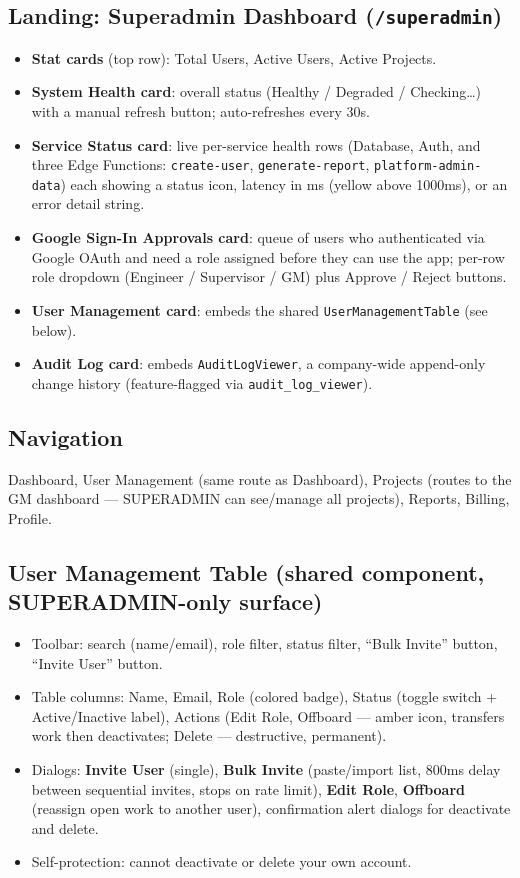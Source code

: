 \documentclass[11pt]{article}
\begin{document}
\subsection{Landing: Superadmin Dashboard (\texttt{/superadmin})}
\begin{itemize}[nosep]
  \item \textbf{Stat cards} (top row): Total Users, Active Users, Active Projects.
  \item \textbf{System Health card}: overall status (Healthy / Degraded / Checking\ldots) with a
    manual refresh button; auto-refreshes every 30s.
  \item \textbf{Service Status card}: live per-service health rows (Database, Auth, and three Edge
    Functions: \texttt{create-user}, \texttt{generate-report}, \texttt{platform-admin-data}) each
    showing a status icon, latency in ms (yellow above 1000ms), or an error detail string.
  \item \textbf{Google Sign-In Approvals card}: queue of users who authenticated via Google OAuth
    and need a role assigned before they can use the app; per-row role dropdown (Engineer /
    Supervisor / GM) plus Approve / Reject buttons.
  \item \textbf{User Management card}: embeds the shared \texttt{UserManagementTable} (see below).
  \item \textbf{Audit Log card}: embeds \texttt{AuditLogViewer}, a company-wide append-only change
    history (feature-flagged via \texttt{audit\_log\_viewer}).
\end{itemize}

\subsection{Navigation}
Dashboard, User Management (same route as Dashboard), Projects (routes to the GM dashboard ---
SUPERADMIN can see/manage all projects), Reports, Billing, Profile.

\subsection{User Management Table (shared component, SUPERADMIN-only surface)}
\begin{itemize}[nosep]
  \item Toolbar: search (name/email), role filter, status filter, ``Bulk Invite'' button, ``Invite
    User'' button.
  \item Table columns: Name, Email, Role (colored badge), Status (toggle switch + Active/Inactive
    label), Actions (Edit Role, Offboard --- amber icon, transfers work then deactivates; Delete
    --- destructive, permanent).
  \item Dialogs: \textbf{Invite User} (single), \textbf{Bulk Invite} (paste/import list, 800ms
    delay between sequential invites, stops on rate limit), \textbf{Edit Role}, \textbf{Offboard}
    (reassign open work to another user), confirmation alert dialogs for deactivate and delete.
  \item Self-protection: cannot deactivate or delete your own account.
\end{itemize}
\end{document}
